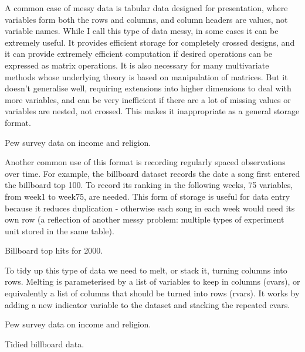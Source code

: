 \documentclass[oneside]{article}
\begin{document}
A common case of messy data is tabular data designed for presentation, where variables form both the rows and columns, and column headers are values, not variable names. While I call this type of data messy, in some cases it can be extremely useful. It provides efficient storage for completely crossed designs, and it can provide extremely efficient computation if desired operations can be expressed as matrix operations. It is also necessary for many multivariate methods whose underlying theory is based on manipulation of matrices. But it doesn't generalise well, requiring extensions into higher dimensions to deal with more variables, and can be very inefficient if there are a lot of missing values or variables are nested, not crossed. This makes it inappropriate as a general storage format.

\begin{table}[htbp]
  \centering
  
  \caption{Pew survey data on income and religion.} 
  \label{tbl:pew-raw}
\end{table}

Another common use of this format is recording regularly spaced observations over time. For example, the billboard dataset records the date a song first entered the billboard top 100. To record its ranking in the following weeks, 75 variables, from week1 to week75, are needed. This form of storage is useful for data entry because it reduces duplication - otherwise each song in each week would need its own row (a reflection of another messy problem: multiple types of experiment unit stored in the same table).

\begin{table}[htbp]
  \centering
  
  \caption{Billboard top hits for 2000.}
  \label{tbl:billboard-raw}
\end{table}

To tidy up this type of data we need to melt, or stack it, turning columns into rows. Melting is parameterised by a list of variables to keep in columns (cvars), or equivalently a list of columns that should be turned into rows (rvars). It works by adding a new indicator variable to the dataset and stacking the repeated cvars.

\begin{table}[htbp]
  \centering
  
  \caption{Pew survey data on income and religion.}
  \label{tbl:pew-clean}
\end{table}

\begin{table}[htbp]
  \centering
  
  \caption{Tidied billboard data.}
  \label{tbl:billboard-clean}
\end{table}
\end{document}
